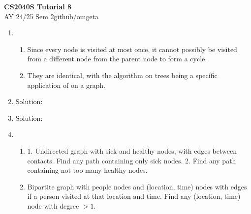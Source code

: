 \documentclass[12pt, a4paper]{article}
\newcommand{\mytitle}{CS2040S Tutorial 8}
\newcommand{\myauthor}{github/omgeta}
\newcommand{\mydate}{AY 24/25 Sem 2}
\begin{document}
\raggedright
\footnotesize
\begin{center}
{\normalsize{\textbf{\mytitle}}} \\
{\footnotesize{\mydate\hspace{2pt}\textemdash\hspace{2pt}\myauthor}}
\end{center}
\begin{enumerate}[Q\arabic*.]
  \item 
    \begin{enumerate}[(\alph*)]
      \item Since every node is visited at most once, it cannot possibly be visited from a different node from the parent node to form a cycle. 

      \item They are identical, with the algorithm on trees being a specific application of on a graph. 
    \end{enumerate}

  \item Solution:

  \item Solution:

  \item 
    \begin{enumerate}[(\alph*.)]
      \item 1. Undirected graph with sick and healthy nodes, with edges between contacts. Find any path containing only sick nodes. 
        2. Find any path containing not too many healthy nodes.

      \item Bipartite graph with people nodes and (location, time) nodes with edges if a person visited at that location and time. Find any (location, time) node with degree $> 1$. 


\end{enumerate}
\end{enumerate}
\end{document}
